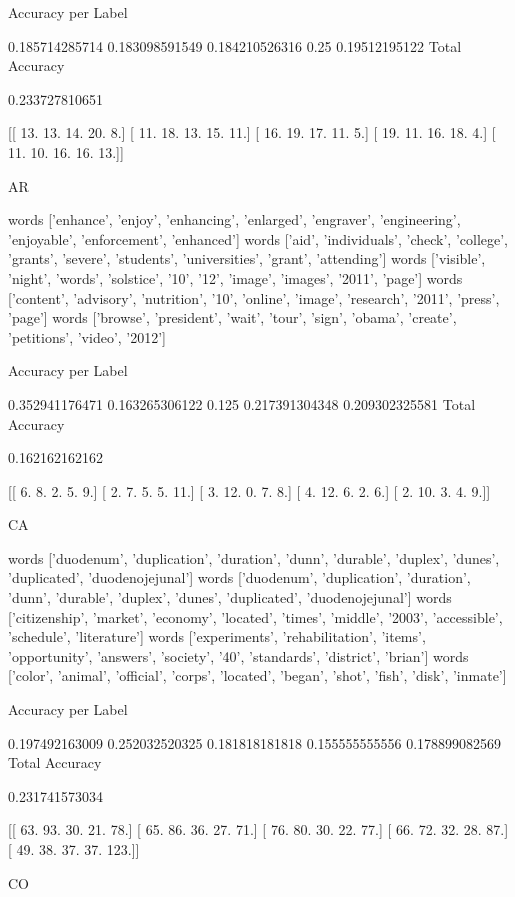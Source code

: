 \documentclass[11pt]{article}
\begin{document}
\begin{verbatium}
Accuracy per Label

0.185714285714
0.183098591549
0.184210526316
0.25
0.19512195122
Total Accuracy

0.233727810651


[[ 13.  13.  14.  20.   8.]
 [ 11.  18.  13.  15.  11.]
 [ 16.  19.  17.  11.   5.]
 [ 19.  11.  16.  18.   4.]
 [ 11.  10.  16.  16.  13.]]


AR


words
['enhance', 'enjoy', 'enhancing', 'enlarged', 'engraver', 'engineering', 'enjoyable', 'enforcement', 'enhanced']
words
['aid', 'individuals', 'check', 'college', 'grants', 'severe', 'students', 'universities', 'grant', 'attending']
words
['visible', 'night', 'words', 'solstice', '10', '12', 'image', 'images', '2011', 'page']
words
['content', 'advisory', 'nutrition', '10', 'online', 'image', 'research', '2011', 'press', 'page']
words
['browse', 'president', 'wait', 'tour', 'sign', 'obama', 'create', 'petitions', 'video', '2012']

Accuracy per Label

0.352941176471
0.163265306122
0.125
0.217391304348
0.209302325581
Total Accuracy

0.162162162162


[[  6.   8.   2.   5.   9.]
 [  2.   7.   5.   5.  11.]
 [  3.  12.   0.   7.   8.]
 [  4.  12.   6.   2.   6.]
 [  2.  10.   3.   4.   9.]]


CA


words
['duodenum', 'duplication', 'duration', 'dunn', 'durable', 'duplex', 'dunes', 'duplicated', 'duodenojejunal']
words
['duodenum', 'duplication', 'duration', 'dunn', 'durable', 'duplex', 'dunes', 'duplicated', 'duodenojejunal']
words
['citizenship', 'market', 'economy', 'located', 'times', 'middle', '2003', 'accessible', 'schedule', 'literature']
words
['experiments', 'rehabilitation', 'items', 'opportunity', 'answers', 'society', '40', 'standards', 'district', 'brian']
words
['color', 'animal', 'official', 'corps', 'located', 'began', 'shot', 'fish', 'disk', 'inmate']

Accuracy per Label

0.197492163009
0.252032520325
0.181818181818
0.155555555556
0.178899082569
Total Accuracy

0.231741573034


[[  63.   93.   30.   21.   78.]
 [  65.   86.   36.   27.   71.]
 [  76.   80.   30.   22.   77.]
 [  66.   72.   32.   28.   87.]
 [  49.   38.   37.   37.  123.]]


CO



\end{verbatium}
\end{document}
